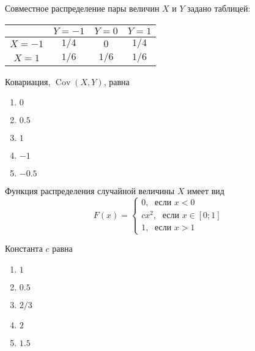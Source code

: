 \documentclass[t]{beamer}
\DeclareMathOperator{\Cov}{Cov}
\begin{document}
 \begin{frame} \label{16} 
\begin{block}{16} 

Совместное распределение пары величин $X$ и $Y$ задано таблицей:

\begin{center}
\begin{tabular}{@{}c|ccc@{}}
\toprule
       & $Y=-1$ & $Y=0$ & $Y=1$ \\ \midrule
$X=-1$ & $1/4$  & $0$   & $1/4$ \\
$X=1$  & $1/6$  & $1/6$ & $1/6$ \\ \bottomrule
\end{tabular}
\end{center}

\vspace{0.5cm} 
 
 
Ковариация, $\Cov(X,Y)$, равна
 


 \end{block} 
\begin{enumerate} 
\item[] \hyperlink{16-Yes}{\beamergotobutton{} $0$}
\item[] \hyperlink{16-No}{\beamergotobutton{} $0.5$}
\item[] \hyperlink{16-No}{\beamergotobutton{} $1$}
\item[] \hyperlink{16-No}{\beamergotobutton{} $-1$
}
\item[] \hyperlink{16-No}{\beamergotobutton{} $-0.5$}
\end{enumerate} 
\end{frame} 


 \begin{frame} \label{17} 
\begin{block}{17} 

Функция распределения случайной величины $X$ имеет вид
\[
F(x)=\begin{cases}
0, \; \text{ если } x<0 \\
cx^2, \; \text{ если } x\in [0;1] \\
1, \; \text{ если } x>1
\end{cases}
\]

\vspace{0.5cm} 
 
 
Константа $c$ равна
 


 \end{block} 
\begin{enumerate} 
\item[] \hyperlink{17-Yes}{\beamergotobutton{} $1$}
\item[] \hyperlink{17-No}{\beamergotobutton{} $0.5$}
\item[] \hyperlink{17-No}{\beamergotobutton{} $2/3$
}
\item[] \hyperlink{17-No}{\beamergotobutton{} $2$}
\item[] \hyperlink{17-No}{\beamergotobutton{} $1.5$}
\end{enumerate} 
\end{frame} 
\end{document}
